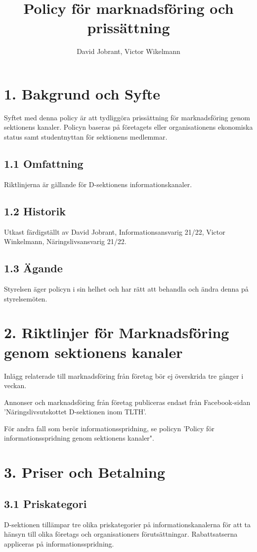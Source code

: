\documentclass{dsekkallelse}
\title{Policy för marknadsföring och prissättning}
\author{David Jobrant, Victor Wikelmann}
\begin{document}
\section{1. Bakgrund och Syfte}
Syftet med denna policy är att tydliggöra prissättning för marknadsföring genom sektionens kanaler. Policyn baseras på företagets eller organisationens ekonomiska status samt studentnyttan för sektionens medlemmar.

\subsection{1.1 Omfattning}
Riktlinjerna är gällande för D-sektionens informationskanaler.

\subsection{1.2 Historik}
Utkast färdigställt av David Jobrant, Informationsansvarig 21/22, Victor Winkelmann, Näringslivsansvarig 21/22.

\subsection{1.3 Ägande}
Styrelsen äger policyn i sin helhet och har rätt att behandla och ändra denna på styrelsemöten.

\section{2. Riktlinjer för Marknadsföring genom sektionens kanaler}
Inlägg relaterade till marknadsföring från företag bör ej överskrida tre gånger i veckan.

Annonser och marknadsföring från företag publiceras endast från Facebook-sidan 'Näringslivsutskottet D-sektionen inom TLTH'.

För andra fall som berör informationsspridning, se policyn 'Policy för informationsspridning genom sektionens kanaler".

\section{3. Priser och Betalning}

\subsection{3.1 Priskategori}

D-sektionen tillämpar tre olika priskategorier på informationskanalerna för att ta hänsyn till olika företags och organisationers förutsättningar.
Rabattsatserna appliceras på informationsspridning.
\end{document}
